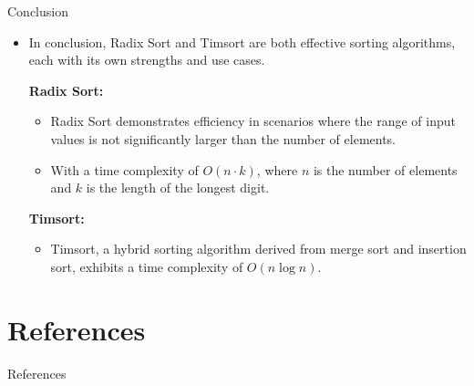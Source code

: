 \documentclass{beamer}
\begin{document}
\begin{frame}{Conclusion}
    \begin{itemize}
        \item In conclusion, Radix Sort and Timsort are both effective sorting algorithms, each with its own strengths and use cases.

              \textbf{Radix Sort:}
              \begin{itemize}
                  \item Radix Sort demonstrates efficiency in scenarios where the range of input values is not significantly larger than the number of elements.
                  \item With a time complexity of $O(n \cdot k)$, where $n$ is the number of elements and $k$ is the length of the longest digit.\cite{alkharabsheh2013review}
              \end{itemize}

              \textbf{Timsort:}
              \begin{itemize}
                  \item Timsort, a hybrid sorting algorithm derived from merge sort and insertion sort, exhibits a time complexity of $O(n \log n)$.
              \end{itemize}
    \end{itemize}
\end{frame}
\section{References}

\begin{frame}[allowframebreaks]{References}
    
    
\end{frame}
\end{document}
